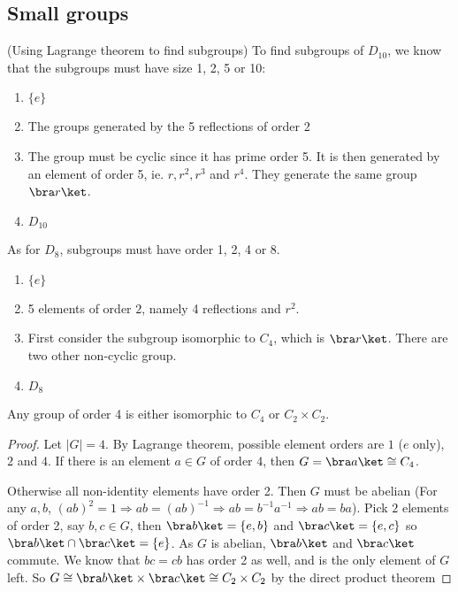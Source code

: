 \documentclass[a4paper]{article}
\begin{document}
\subsection{Small groups}
\begin{eg}
  (Using Lagrange theorem to find subgroups) To find subgroups of $D_{10}$, we know that the subgroups must have size 1, 2, 5 or 10:
  \begin{enumerate}[label=\arabic{*}:]
    \item $\{e\}$
    \item The groups generated by the 5 reflections of order 2
      \setcounter{enumi}{4}
    \item The group must be cyclic since it has prime order 5. It is then generated by an element of order 5, ie. $r, r^2, r^3$ and $r^4$. They generate the same group $\bra r\ket$.
      \setcounter{enumi}{9}
    \item $D_{10}$
  \end{enumerate}

  As for $D_8$, subgroups must have order 1, 2, 4 or 8.
  \begin{enumerate}[label=\arabic{*}:]
    \item $\{e\}$
    \item 5 elements of order $2$, namely 4 reflections and $r^2$.
      \setcounter{enumi}{3}
    \item First consider the subgroup isomorphic to $C_4$, which is $\bra r\ket$. There are two other non-cyclic group.
      \setcounter{enumi}{7}
    \item $D_8$
  \end{enumerate}
\end{eg}

\begin{prop}
  Any group of order 4 is either isomorphic to $C_4$ or $C_2\times C_2$.
\end{prop}

\begin{proof}
  Let $|G| = 4$. By Lagrange theorem, possible element orders are $1$ ($e$ only), $2$ and $4$. If there is an element $a\in G$ of order $4$, then $G = \bra a\ket \cong C_4$.

  Otherwise all non-identity elements have order 2. Then $G$ must be abelian (For any $a, b$, $(ab)^2 = 1 \Rightarrow ab = (ab)^{-1} \Rightarrow ab = b^{-1}a^{-1} \Rightarrow ab = ba$).
  Pick $2$ elements  of order 2, say $b, c\in G$, then $\bra b\ket=\{e, b\}$ and $\bra c\ket = \{e, c\}$ so $\bra b\ket\cap \bra c\ket = \{e\}$. As $G$ is abelian, $\bra b\ket$ and $\bra c\ket$ commute. We know that $bc = cb$ has order 2 as well, and is the only element of $G$ left. So $G \cong \bra b\ket\times \bra c\ket \cong C_2\times C_2$ by the direct product theorem
\end{proof}
\end{document}
